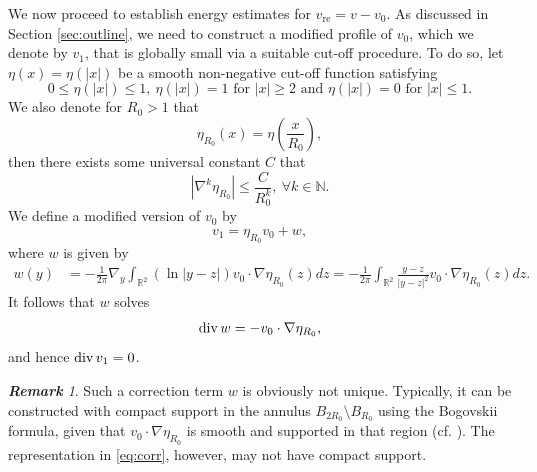 \documentclass[12pt]{amsart}
\renewcommand{\div}{{\rm div \thinspace }}
\numberwithin{equation}{section}              %
\theoremstyle{remark}
\newtheorem{remark}{\bf Remark}[section]
\begin{document}
		
		We now proceed to establish energy estimates for $v_{\text{re}} = v - v_0$. As discussed in Section \ref{sec:outline}, we need to construct a modified profile of $v_0$, which we denote by $v_1$,  that is globally small via a suitable cut-off procedure.
		To do so,  let $\eta(x)=\eta(|x|)$ be a smooth non-negative cut-off function
		satisfying 
		\begin{equation*}
			0\leq \eta (|x|) \leq 1, ~	\eta (|x|) =1 \textrm{ for } |x|\geq 2 \textrm{ and } \eta (|x|) =0  \textrm{ for }  |x|\leq 1.
		\end{equation*}
		We also denote for $R_0>1$ that
		\begin{equation}\label{eq:resacledversion}
			\eta_{R_0}(x)=\eta\left(\frac{x}{{R_0}}\right),
		\end{equation}
		then there exists some universal constant $C$ that
		\begin{equation*}
			|\nabla^k \eta_{R_0}|\leq \frac{C}{R_0^k}, ~ \forall k\in \mathbb{N}.
		\end{equation*}
		We define a modified version of $v_0$ by 
		\begin{equation}\label{eq:defoftildev}
			v_1= \eta_{R_0}	 v_0 +w, 
		\end{equation}
		where $w$ is given by
        \begin{equation}\label{eq:corr}
			\begin{aligned}
				w(y) &=  - \frac{1}{2\pi}\nabla_y \int_{\mathbb{R}^2} (\ln |y-z|)v_0\cdot \nabla  \eta_{R_0}(z)dz
				= -\frac{1}{2\pi} \int_{\mathbb{R}^2} \frac{y-z}{|y-z|^2}v_0 \cdot \nabla  \eta_{R_0}(z)dz.
			\end{aligned}
		\end{equation}
        It follows that $w$ solves 
		\begin{equation*}
			\div w = -v_0\cdot \nabla \eta_{R_0}, 
		\end{equation*}
and hence  $\div v_1=0$.
		
		\begin{remark}
			Such a correction term $w$ is obviously not unique. Typically, it can be constructed with compact support in the annulus $B_{2R_0} \setminus B_{R_0}$ using the Bogovskii formula, given that $v_0 \cdot \nabla \eta_{R_0}$ is smooth and supported in that region (cf. \cite[Theorem III.3.3]{Galdi11}). The representation in \eqref{eq:corr}, however, may not have compact support.
		\end{remark}
		
\end{document}
